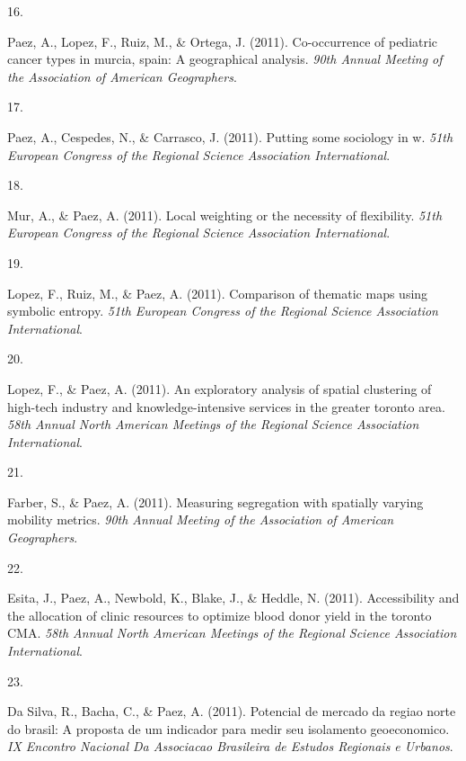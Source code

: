 \documentclass[10pt,a4paper,]{twentysecondcv}
\newlength{\csllabelwidth}
\newcommand{\CSLLeftMargin}[1]{\parbox[t]{\csllabelwidth}{#1}}
\newcommand{\CSLRightInline}[1]{\parbox[t]{\linewidth - \csllabelwidth}{#1}}
\begin{document}
\leavevmode{}%
\CSLLeftMargin{16. }%
\CSLRightInline{Paez, A., Lopez, F., Ruiz, M., \& Ortega, J. (2011).
Co-occurrence of pediatric cancer types in murcia, spain: A geographical
analysis. \emph{90th Annual Meeting of the Association of American
Geographers}.}

\leavevmode{}%
\CSLLeftMargin{17. }%
\CSLRightInline{Paez, A., Cespedes, N., \& Carrasco, J. (2011). Putting
some sociology in w. \emph{51th European Congress of the Regional
Science Association International}.}

\leavevmode{}%
\CSLLeftMargin{18. }%
\CSLRightInline{Mur, A., \& Paez, A. (2011). Local weighting or the
necessity of flexibility. \emph{51th European Congress of the Regional
Science Association International}.}

\leavevmode{}%
\CSLLeftMargin{19. }%
\CSLRightInline{Lopez, F., Ruiz, M., \& Paez, A. (2011). Comparison of
thematic maps using symbolic entropy. \emph{51th European Congress of
the Regional Science Association International}.}

\leavevmode{}%
\CSLLeftMargin{20. }%
\CSLRightInline{Lopez, F., \& Paez, A. (2011). An exploratory analysis
of spatial clustering of high-tech industry and knowledge-intensive
services in the greater toronto area. \emph{58th Annual North American
Meetings of the Regional Science Association International}.}

\leavevmode{}%
\CSLLeftMargin{21. }%
\CSLRightInline{Farber, S., \& Paez, A. (2011). Measuring segregation
with spatially varying mobility metrics. \emph{90th Annual Meeting of
the Association of American Geographers}.}

\leavevmode{}%
\CSLLeftMargin{22. }%
\CSLRightInline{Esita, J., Paez, A., Newbold, K., Blake, J., \& Heddle,
N. (2011). Accessibility and the allocation of clinic resources to
optimize blood donor yield in the toronto CMA. \emph{58th Annual North
American Meetings of the Regional Science Association International}.}

\leavevmode{}%
\CSLLeftMargin{23. }%
\CSLRightInline{Da Silva, R., Bacha, C., \& Paez, A. (2011). Potencial
de mercado da regiao norte do brasil: A proposta de um indicador para
medir seu isolamento geoeconomico. \emph{IX Encontro Nacional Da
Associacao Brasileira de Estudos Regionais e Urbanos}.}
\end{document}
